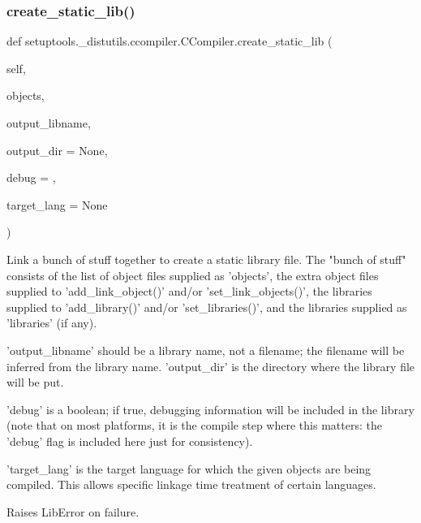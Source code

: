 \subsubsection{\texorpdfstring{create\+\_\+static\+\_\+lib()}{create\_static\_lib()}}
{\footnotesize\ttfamily def setuptools.\+\_\+distutils.\+ccompiler.\+C\+Compiler.\+create\+\_\+static\+\_\+lib (\begin{DoxyParamCaption}\item[{}]{self,  }\item[{}]{objects,  }\item[{}]{output\+\_\+libname,  }\item[{}]{output\+\_\+dir = {\ttfamily None},  }\item[{}]{debug = {},  }\item[{}]{target\+\_\+lang = {\ttfamily None} }\end{DoxyParamCaption})}

\begin{DoxyVerb}Link a bunch of stuff together to create a static library file.
The "bunch of stuff" consists of the list of object files supplied
as 'objects', the extra object files supplied to
'add_link_object()' and/or 'set_link_objects()', the libraries
supplied to 'add_library()' and/or 'set_libraries()', and the
libraries supplied as 'libraries' (if any).

'output_libname' should be a library name, not a filename; the
filename will be inferred from the library name.  'output_dir' is
the directory where the library file will be put.

'debug' is a boolean; if true, debugging information will be
included in the library (note that on most platforms, it is the
compile step where this matters: the 'debug' flag is included here
just for consistency).

'target_lang' is the target language for which the given objects
are being compiled. This allows specific linkage time treatment of
certain languages.

Raises LibError on failure.
\end{DoxyVerb}
 \mbox{\label{classsetuptools_1_1__distutils_1_1ccompiler_1_1CCompiler_a961d966d875401f72e477adcd73b3e10}} 
